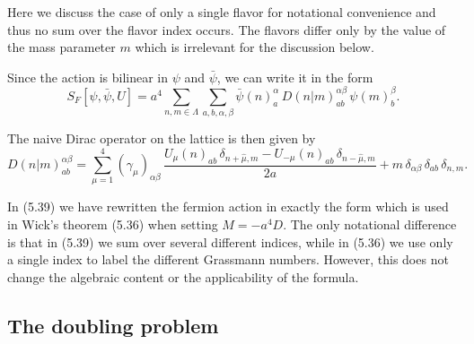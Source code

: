 Here we discuss the case of only a single flavor for notational convenience and
thus no sum over the flavor index occurs. The flavors differ only by the value
of the mass parameter $m$ which is irrelevant for the discussion below.

Since the action is bilinear in $\psi$ and $\bar{\psi}$, we can write it in the form
\begin{equation}
  S_F[\psi,\bar{\psi},U] = a^4\sum_{n,m\in\Lambda}\sum_{a,b,\alpha,\beta}
    \bar{\psi}(n)^{\alpha}_a\,D(n|m)^{\alpha\beta}_{ab}\,\psi(m)^{\beta}_b .
\end{equation}

The naive Dirac operator on the lattice is then given by
\begin{equation}
  D(n|m)^{\alpha\beta}_{ab} = \sum_{\mu=1}^{4}(\gamma_\mu)_{\alpha\beta}\,
    \frac{U_\mu(n)_{ab}\,\delta_{n+\hat{\mu},m} - U_{-\mu}(n)_{ab}\,\delta_{n-\hat{\mu},m}}{2a}
    + m\,\delta_{\alpha\beta}\,\delta_{ab}\,\delta_{n,m} .
\end{equation}

In (5.39) we have rewritten the fermion action in exactly the form which is
used in Wick's theorem (5.36) when setting $M = -a^4 D$. The only notational
difference is that in (5.39) we sum over several different indices, while in (5.36)
we use only a single index to label the different Grassmann numbers. However,
this does not change the algebraic content or the applicability of the formula.

\subsection{The doubling problem}

